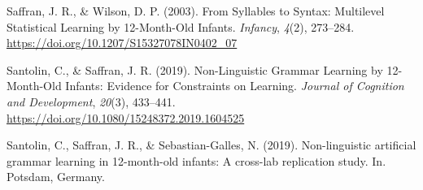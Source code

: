 \begin{appendix}
\leavevmode\hypertarget{ref-saffran2003}{}%
Saffran, J. R., \& Wilson, D. P. (2003). From Syllables to Syntax:
Multilevel Statistical Learning by 12-Month-Old Infants. \emph{Infancy},
\emph{4}(2), 273--284. \url{https://doi.org/10.1207/S15327078IN0402_07}

\leavevmode\hypertarget{ref-santolin2019}{}%
Santolin, C., \& Saffran, J. R. (2019). Non-Linguistic Grammar Learning
by 12-Month-Old Infants: Evidence for Constraints on Learning.
\emph{Journal of Cognition and Development}, \emph{20}(3), 433--441.
\url{https://doi.org/10.1080/15248372.2019.1604525}

\leavevmode\hypertarget{ref-santolin2019a}{}%
Santolin, C., Saffran, J. R., \& Sebastian-Galles, N. (2019).
Non-linguistic artificial grammar learning in 12-month-old infants: A
cross-lab replication study. In. Potsdam, Germany.

\endgroup
\end{appendix}

